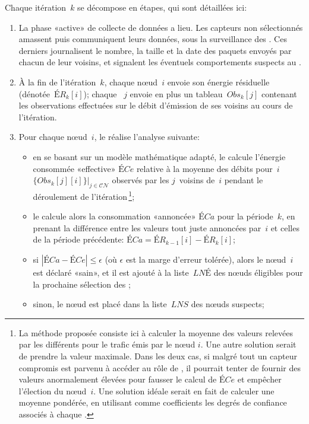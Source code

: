 Chaque itération~$k$ se décompose en étapes, qui sont détaillées ici:
\begin{enumerate}
    \item La phase «active» de collecte de données a lieu. Les capteurs non sélectionnés amassent puis communiquent leurs données, sous la surveillance des \cns. Ces derniers journalisent le nombre, la taille et la date des paquets envoyés par chacun de leur voisins, et signalent les éventuels comportements suspects au \ch.
    \item À la fin de l'itération~$k$, chaque nœud~$i$ envoie son énergie résiduelle (dénotée~$\mathit{ÉR}_k[i]$); chaque \cn~$j$ envoie en plus un tableau~$\mathit{Obs}_k[j]$ contenant les observations effectuées sur le débit d'émission de ses voisins au cours de l'itération.
    \item Pour chaque nœud~$i$, le \ch réalise l'analyse suivante:
        \begin{itemize}
            \item en se basant sur un modèle mathématique adapté, le \CH calcule l'énergie consommée «effective» $\mathit{ÉCe}$ relative à la moyenne des débits pour~$i$ $\{\mathit{Obs}_k[j][i]\}|_{j\in \mathcal{CN}}$ observés par les $j$~\cns voisins de~$i$ pendant le déroulement de l'itération\,\footnote{La méthode proposée consiste ici à calculer la moyenne des valeurs relevées par les différents \cns pour le trafic émis par le nœud $i$. Une autre solution serait de prendre la valeur maximale. Dans les deux cas, si malgré tout un capteur compromis est parvenu à accéder au rôle de \cn, il pourrait tenter de fournir des valeurs anormalement élevées pour fausser le calcul de $\mathit{ÉCe}$ et empêcher l'élection du nœud~$i$. Une solution idéale serait en fait de calculer une moyenne pondérée, en utilisant comme coefficients les degrés de confiance associés à chaque \cn.};
            \item le \CH calcule alors la consommation «annoncée» $\mathit{ÉCa}$ pour la période~$k$, en prenant la différence entre les valeurs tout juste annoncées par~$i$ et celles de la période précédente: $\mathit{ÉCa}=\mathit{ÉR}_{k-1}[i] - \mathit{ÉR}_k[i]$;
            \item si $|\mathit{ÉCa}-\mathit{ÉCe}|\leq\epsilon$ (où $\epsilon$ est la marge d'erreur tolérée), alors le nœud~$i$ est déclaré «sain», et il est ajouté à la liste~$\mathit{LNÉ}$ des nœuds éligibles pour la prochaine sélection des \cns;
            \item sinon, le nœud est placé dans la liste~$\mathit{LNS}$ des nœuds suspects;

\end{itemize}
\end{enumerate}
